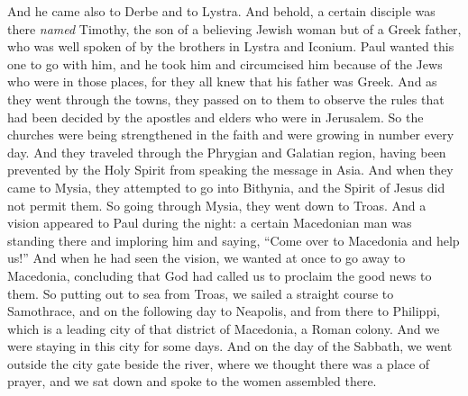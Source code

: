 \begin{biblechapter} %
 And he came also to Derbe and to Lystra. And behold, a certain disciple was there \textit{named} Timothy, the son of a believing Jewish woman but of a Greek father,
\verse who was well spoken of by the brothers in Lystra and Iconium.
\verse Paul wanted this one to go with him, and he took him and circumcised him because of the Jews who were in those places, for they all knew that his father was Greek.
\verse And as they went through the towns, they passed on to them to observe the rules that had been decided by the apostles and elders who were in Jerusalem.
\verse So the churches were being strengthened in the faith and were growing in number every day.
 And they traveled through the Phrygian and Galatian region, having been prevented by the Holy Spirit from speaking the message in Asia.
\verse And when they came to Mysia, they attempted to go into Bithynia, and the Spirit of Jesus did not permit them.
\verse So going through Mysia, they went down to Troas.
\verse And a vision appeared to Paul during the night: a certain Macedonian man was standing there and imploring him and saying, “Come over to Macedonia and help us!”
\verse And when he had seen the vision, we wanted at once to go away to Macedonia, concluding that God had called us to proclaim the good news to them.
 So putting out to sea from Troas, we sailed a straight course to Samothrace, and on the following day to Neapolis,
\verse and from there to Philippi, which is a leading city of that district of Macedonia, a Roman colony. And we were staying in this city for some days.
\verse And on the day of the Sabbath, we went outside the city gate beside the river, where we thought there was a place of prayer, and we sat down and spoke to the women assembled there.

\end{biblechapter}
